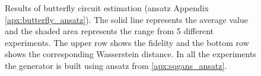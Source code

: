 \begin{figure}[htbp!]
  \caption{Results of butterfly circuit estimation (ansatz Appendix \ref{apx:butterfly_ansatz}).
    The solid line represents the average value and the shaded area
    represents the range from 5 different experiments. The upper row shows the
    fidelity and the bottom row shows the corresponding Wasserstein distance. In all the
    experiments the generator is built using ansatz from \ref{apx:sqgans_ansatz}.}
  \label{fig:wqgans_res_butterfly_3}
\end{figure}
\let\clearpage\oldclearpage
